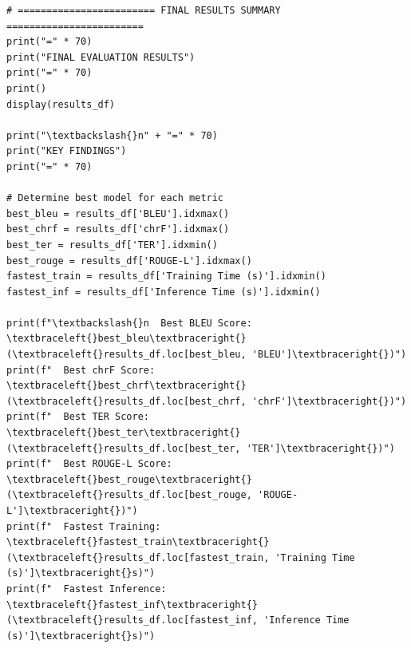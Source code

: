 \documentclass[12pt,a4paper,oneside]{report}
\begin{document}
\begin{Verbatim}[commandchars=\\\{\},breaklines=true,breakanywhere=true,fontsize=\scriptsize,frame=leftline,framesep=2mm,rulecolor=\color{gray}]
# ======================== FINAL RESULTS SUMMARY ========================
print("=" * 70)
print("FINAL EVALUATION RESULTS")
print("=" * 70)
print()
display(results_df)

print("\textbackslash{}n" + "=" * 70)
print("KEY FINDINGS")
print("=" * 70)

# Determine best model for each metric
best_bleu = results_df['BLEU'].idxmax()
best_chrf = results_df['chrF'].idxmax()
best_ter = results_df['TER'].idxmin()
best_rouge = results_df['ROUGE-L'].idxmax()
fastest_train = results_df['Training Time (s)'].idxmin()
fastest_inf = results_df['Inference Time (s)'].idxmin()

print(f"\textbackslash{}n  Best BLEU Score:       \textbraceleft{}best_bleu\textbraceright{} (\textbraceleft{}results_df.loc[best_bleu, 'BLEU']\textbraceright{})")
print(f"  Best chrF Score:       \textbraceleft{}best_chrf\textbraceright{} (\textbraceleft{}results_df.loc[best_chrf, 'chrF']\textbraceright{})")
print(f"  Best TER Score:        \textbraceleft{}best_ter\textbraceright{} (\textbraceleft{}results_df.loc[best_ter, 'TER']\textbraceright{})")
print(f"  Best ROUGE-L Score:    \textbraceleft{}best_rouge\textbraceright{} (\textbraceleft{}results_df.loc[best_rouge, 'ROUGE-L']\textbraceright{})")
print(f"  Fastest Training:      \textbraceleft{}fastest_train\textbraceright{} (\textbraceleft{}results_df.loc[fastest_train, 'Training Time (s)']\textbraceright{}s)")
print(f"  Fastest Inference:     \textbraceleft{}fastest_inf\textbraceright{} (\textbraceleft{}results_df.loc[fastest_inf, 'Inference Time (s)']\textbraceright{}s)")
\end{Verbatim}
\end{document}
